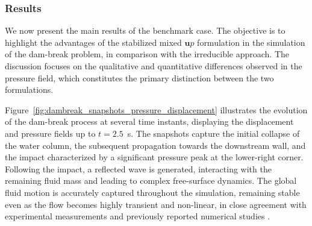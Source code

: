 \documentclass[11pt,english]{article}
\def\up{$\boldsymbol{u}p$\xspace}
\begin{document}
\subsubsection{Results}

    We now present the main results of the benchmark case. The objective is to highlight the advantages of the stabilized mixed \up formulation in the simulation of the dam-break problem, in comparison with the irreducible approach. The discussion focuses on the qualitative and quantitative differences observed in the pressure field, which constitutes the primary distinction between the two formulations.
    
    Figure~\ref{fig:dambreak_snapshots_pressure_displacement} illustrates the evolution of the dam-break process at several time instants, displaying the displacement and pressure fields up to $t = 2.5$~s. The snapshots capture the initial collapse of the water column, the subsequent propagation towards the downstream wall, and the impact characterized by a significant pressure peak at the lower-right corner. Following the impact, a reflected wave is generated, interacting with the remaining fluid mass and leading to complex free-surface dynamics. The global fluid motion is accurately captured throughout the simulation, remaining stable even as the flow becomes highly transient and non-linear, in close agreement with experimental measurements and previously reported numerical studies \cite{chandra2024stabilized}.
\end{document}
